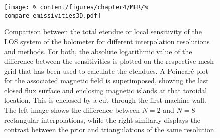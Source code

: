 %
            \begin{figure}[t]%
                \centering%
                \texttt{[image: \%
                    content/figures/chapter4/MFR/\%
                    compare\_emissivities3D.pdf]}%
                \caption{Comparison between the total etendue or local sensitivity of the LOS system of the bolometer for different interpolation resolutions and methods. For both, the absolute logarithmic value of the difference between the sensitivities is plotted on the respective mesh grid that has been used to calculate the etendues. A Poincaré plot for the associated magnetic field is superimposed, showing the last closed flux surface and enclosing magnetic islands at that toroidal location. This is enclosed by a cut through the first machine wall. The left image shows the difference between $N=2$ and $N=8$ rectangular interpolations, while the right similarly displays the contrast between the prior and triangulations of the same resolution.}\label{fig:2Detendues_comparison_splitting}%
            \end{figure}%
%
